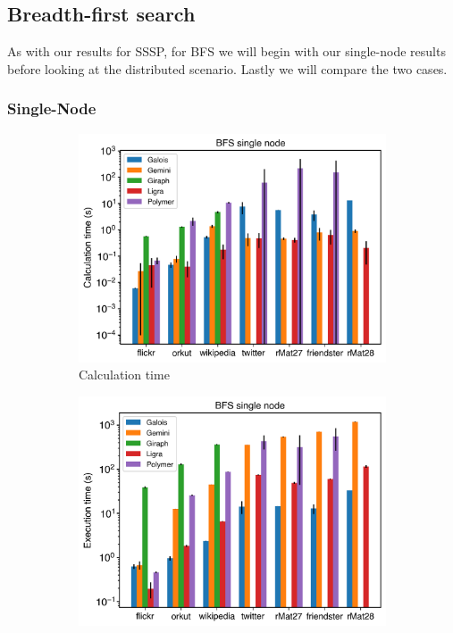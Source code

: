 
\subsection{Breadth-first search}
As with our results for SSSP, for BFS we will begin with our single-node results before looking at the distributed scenario. Lastly we will compare the two cases.
\subsubsection{Single-Node}
\begin{figure}
	\begin{subfigure}{0.32\textwidth}
		\includegraphics[width=\linewidth]{../../plots/singleNodeBFS_calcTime.png}
		\caption{Calculation time}
		\label{fig:singleNodeBFS_calc}
	\end{subfigure}
	\hfil
	\begin{subfigure}{0.32\textwidth}
		\includegraphics[width=\linewidth]{../../plots/singleNodeBFS_execTime.png}

\end{subfigure}
\end{figure}
